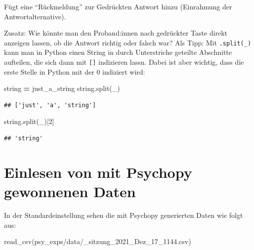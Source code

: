 \documentclass[
]{book}
\newenvironment{Shaded}{\begin{snugshade}}{\end{snugshade}}
\newcommand{\DecValTok}[1]{\textcolor[rgb]{0.00,0.00,0.81}{#1}}
\newcommand{\FunctionTok}[1]{\textcolor[rgb]{0.00,0.00,0.00}{#1}}
\newcommand{\NormalTok}[1]{#1}
\newcommand{\OperatorTok}[1]{\textcolor[rgb]{0.81,0.36,0.00}{\textbf{#1}}}
\newcommand{\StringTok}[1]{\textcolor[rgb]{0.31,0.60,0.02}{#1}}
\begin{document}
Fügt eine ``Rückmeldung'' zur Gedrückten Antwort hinzu (Einrahmung der Antwortalternative).

Zusatz:
Wie könnte man den Proband:innen nach gedrückter Taste direkt anzeigen lassen, ob die Antwort richtig oder falsch war? Als Tipp: Mit \texttt{.split(\textquotesingle{}\_\textquotesingle{})} kann man in Python einen String in durch Unterstriche geteilte Abschnitte aufteilen, die sich dann mit \texttt{{[}{]}} indizieren lassn. Dabei ist aber wichtig, dass die erste Stelle in Python mit der 0 indiziert wird:

\begin{Shaded}
\begin{Highlighting}[]
\NormalTok{string }\OperatorTok{=} \StringTok{\textquotesingle{}just\_a\_string\textquotesingle{}}
\NormalTok{string.split(}\StringTok{\textquotesingle{}\_\textquotesingle{}}\NormalTok{)}
\end{Highlighting}
\end{Shaded}

\begin{verbatim}
## ['just', 'a', 'string']
\end{verbatim}

\begin{Shaded}
\begin{Highlighting}[]
\NormalTok{string.split(}\StringTok{\textquotesingle{}\_\textquotesingle{}}\NormalTok{)[}\DecValTok{2}\NormalTok{]}
\end{Highlighting}
\end{Shaded}

\begin{verbatim}
## 'string'
\end{verbatim}

\hypertarget{einlesen-von-mit-psychopy-gewonnenen-daten}{%
\section{Einlesen von mit Psychopy gewonnenen Daten}\label{einlesen-von-mit-psychopy-gewonnenen-daten}}

In der Standardeinstellung sehen die mit Psychopy generierten Daten wie folgt aus:

\begin{Shaded}
\begin{Highlighting}[]
\FunctionTok{read\_csv}\NormalTok{(}\StringTok{\textquotesingle{}psy\_exps/data/\_sitzung\_2021\_Dez\_17\_1144.csv\textquotesingle{}}\NormalTok{)}
\end{Highlighting}
\end{Shaded}
\end{document}
